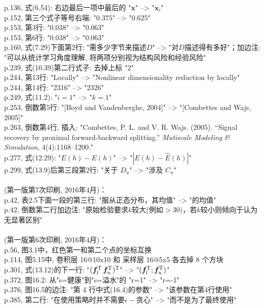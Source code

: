 \documentclass[UTF8]{article}
\begin{document}
p.136, 式(6.54): 右边最后一项中最后的 "${\bm x}$" --> "${\bm x}_i$" \\
p.152, 第三个式子等号右端: "$0.375$" --> "$0.625$" \\
p.153, 第3行: "$0.038$" --> "$0.063$" \\
p.153, 第6行: "$0.038$" --> "$0.063$" \\
p.160, 式(7.29)下面第2行: "需多少字节来描述$D$" --> "对$D$描述得有多好"；加边注: "可以从统计学习角度理解, 将两项分别视为结构风险和经验风险" \\
p.239, 式(10.39)第二行式子: 去掉上标 "$2$" \\
p.244, 第13行: "Locally" --> "Nonlinear dimensionality reduction by locally" \\
p.244, 第14行: "2316" --> "2326" \\
p.249, 式(11.2): "$i=1$" --> "$k=1$" \\
p.253, 倒数第5行: "[Boyd and Vandenberghe, 2004]" --> "[Combettes and Wajs, 2005]" \\
p.263, 倒数第4行, 插入: "Combettes, P. L. and V. R. Wajs. (2005). ``Signal recovery by proximal forward-backward splitting.'' \textit{Mutiscale Modeling \& Simulation}, 4(4):1168--1200." \\
p.277, 式(12.29): "$E(h) - \hat{E}(h)$" --> "$\left| E(h) - \hat{E}(h) \right|$" \\
p.299, 式(13.9)后第三段第2行: "关于 $D_u$" --> "涉及 $C_u$" \\
\\
(第一版第7次印刷, 2016年4月)：
\\
p.42, 表2.5下面一段的第三行: "服从正态分布，其均值" --> "的均值" \\
p.42, 倒数第二行加边注: "原始检验要求$k$较大(例如$>30$)，若$k$较小则倾向于认为无显著区别" \\
\\
(第一版第6次印刷, 2016年4月)：
\\
p.56, 图3.1中，红色第一和第二个点的坐标互换 \\
p.114, 图5.15中, 卷积层 16@10x10 和 采样层 16@5x5 各去掉 8 个方块 \\
p.301, 式(13.12)的下一行: "$({\bm f}_l^{\rm T}\,{\bm f}_u^{\rm T})^{\rm T}$" --> "$({\bm f}_l^{\rm T}; {\bm f}_u^{\rm T})$" \\
p.372, 图16.2: 从"s=健康"到"s=溢水"的 "r=1" --> "r=-1" \\
p.376, 图16.5的边注: "第 4 行中式(16.4)的参数" --> "该参数在第4行使用" \\
p.385, 第二行: "在使用策略时并不需要$\epsilon-$贪心" --> "而不是为了最终使用" \\
\end{document}
